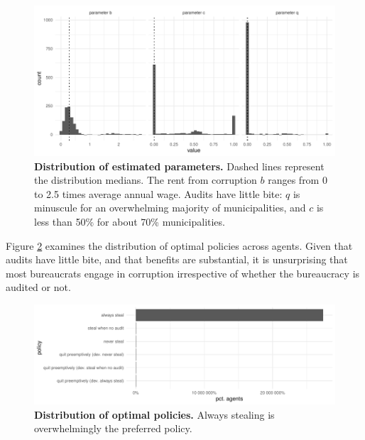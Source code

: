 \documentclass[12pt,a4paper]{article}
\theoremstyle{definition}
\begin{document}
{\begin{figure}[H]
    \centering
    \includegraphics{figures/parametersStructural.pdf}
    \caption{{\bf Distribution of estimated parameters.} Dashed lines represent the distribution medians. The rent from corruption $b$ ranges from 0 to 2.5 times average annual wage. Audits have little bite: $q$ is minuscule for an overwhelming majority of municipalities, and $c$ is less than 50\% for about 70\% municipalities.}
    \label{fig:mainResultStructural}
\end{figure}

Figure \ref{fig:distribPoliciesStructural} examines the distribution of optimal policies across agents. Given that audits have little bite, and that benefits are substantial, it is unsurprising that most bureaucrats engage in corruption irrespective of whether the bureaucracy is audited or not. 

\begin{figure}[H]
    \centering
    \includegraphics{figures/strategiesStructural.pdf}
    \caption{{\bf Distribution of optimal policies.} Always stealing is overwhelmingly the preferred policy.}
    \label{fig:distribPoliciesStructural}
\end{figure}

}
\end{document}
